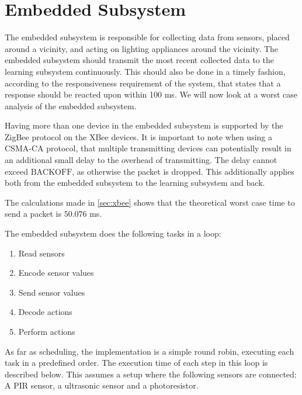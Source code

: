 \section{Embedded Subsystem}\label{sub:sensorStation}

The embedded subsystem is responsible for collecting data from sensors, placed around a vicinity, and acting on lighting appliances around the vicinity. The embedded subsystem should transmit the most recent collected data to the learning subsystem continuously. This should also be done in a timely fashion, according to the responsiveness requirement of the system, that states that a response should be reacted upon within 100 ms. We will now look at a worst case analysis of the embedded subsystem.

Having more than one device in the embedded subsystem is supported by the ZigBee\cite{xbee_latency} protocol on the XBee devices. It is important to note when using a CSMA-CA protocol, that multiple transmitting devices can potentially result in an additional small delay to the overhead of transmitting. The delay cannot exceed $\text{BACKOFF}$, as otherwise the packet is dropped. This additionally applies both from the embedded subsystem to the learning subsystem and back.

The calculations made in \cref{sec:xbee} shows that the theoretical worst case time to send a packet is $50.076$ ms.

The embedded subsystem does the following tasks in a loop:
\begin{enumerate}
  \item Read sensors
  \item Encode sensor values
  \item Send sensor values
  \item Decode actions
  \item Perform actions
\end{enumerate}

As far as scheduling, the implementation is a simple round robin, executing each task in a predefined order. The execution time of each step in this loop is described below. This assumes a setup where the following sensors are connected: A PIR sensor, a ultrasonic sensor and a photoresistor.

